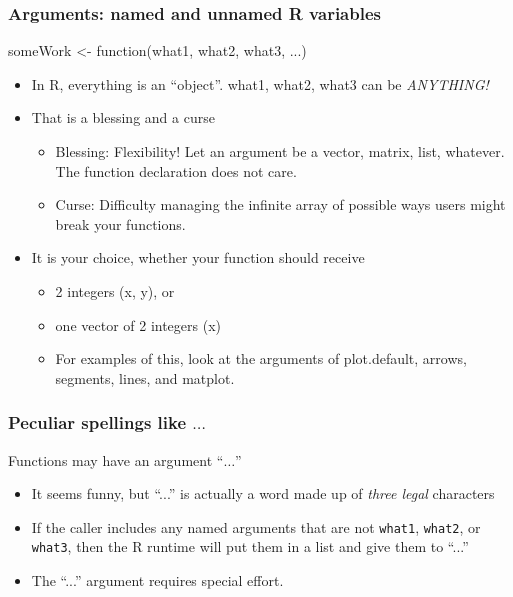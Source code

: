 \documentclass[11pt,english]{beamer}
\begin{document}
\begin{frame}[containsverbatim]
  \frametitle{Arguments: named and unnamed R variables}
  \begin{Sinput}
    someWork <-  function(what1, what2, what3, ...)
  \end{Sinput}

  \begin{itemize}
  \item In R, everything is an ``object''. what1, what2, what3 can be \emph{ANYTHING!}
  \item That is a blessing and a curse
    \begin{itemize}
    \item Blessing: Flexibility! Let an argument be a vector, matrix,
      list, whatever. The function declaration does not care.
    \item Curse: Difficulty managing the infinite array of possible
      ways users might break your functions.
    \end{itemize}
  \item It is your choice, whether your function should receive
    \begin{itemize}
    \item  2 integers (x, y), or
    \item  one vector of 2 integers (x)
    \item For examples of this, look at the arguments of
      plot.default, arrows, segments, lines, and matplot.
  \end{itemize}
\end{itemize}
\end{frame}


\begin{frame}[containsverbatim]
  \frametitle{Peculiar spellings like $\ldots$}
  Functions may have an argument ``$\ldots$''
  \begin{itemize}
  \item It seems funny, but ``...'' is actually a word made up of
    \emph{three legal} characters
  \item If the caller includes any named arguments that are not
    \texttt{what1}, \texttt{what2}, or \texttt{what3}, then the R
    runtime will put them in a list and give them to ``...''
  \item The ``...'' argument requires special effort.
  \end{itemize}
\end{frame}
\end{document}

